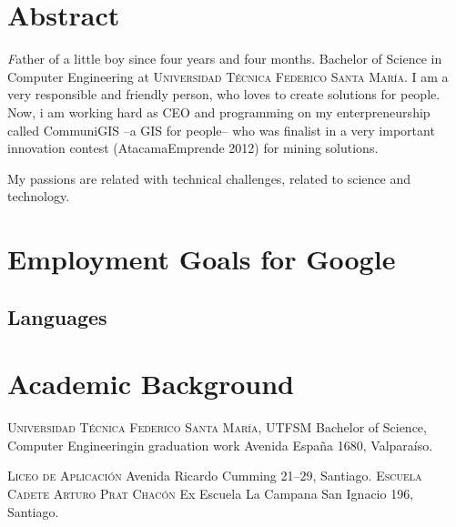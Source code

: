 \documentclass[11pt,letterpaper,roman]{moderncv}
\begin{document}
\maketitle

\section*{\textbf{Abstract}} 
	\textsl Father of a little boy since four years
	and four months. Bachelor of Science in Computer Engineering at
	\textsc{Universidad Técnica Federico Santa María}. I am a very responsible and friendly person, who loves
	to create solutions for people. 
	Now, i am working hard as CEO and programming on my enterpreneurship called CommuniGIS --a GIS for people--
	who was finalist in a very important innovation contest (AtacamaEmprende 2012) for mining solutions.  

	My passions are related with technical challenges, related to science and technology.
\section{Employment Goals for Google}

\subsection{Languages} 


\section{Academic Background}
	{\textsc{Universidad T\'ecnica Federico Santa Mar\'ia, UTFSM}}
	{Bachelor of Science, Computer Engineering}{in graduation work}
	{}
	{Avenida España 1680, Valparaíso.}

	{\textsc{Liceo de Aplicaci\'on}}
	{}
	{}
	{}
	{Avenida Ricardo Cumming 21--29, Santiago.}
	{\textsc{Escuela Cadete Arturo Prat Chac\'on}}
	{Ex Escuela La Campana}
	{}
	{}
	{San Ignacio 196, Santiago.}
\end{document}
